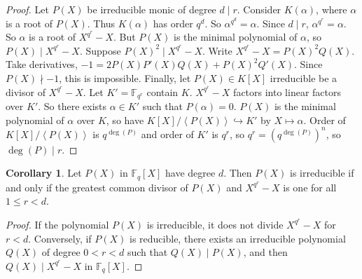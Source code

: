 \documentclass{article}
\newcommand{\F}{\mathbb{F}}
\newcommand{\rb}[1]{\left( #1 \right)}
\renewcommand{\sb}[1]{\left[ #1 \right]}
\newcommand{\ab}[1]{\left\langle #1 \right\rangle}
\theoremstyle{definition}\newtheorem{definition}{Definition}[subsection]
\theoremstyle{definition}\newtheorem{remark}[definition]{Remark}
\theoremstyle{definition}\newtheorem*{example}{Example}
\theoremstyle{definition}\newtheorem*{note}{Note}
\newtheorem{corollary}[definition]{Corollary}
\begin{document}
\begin{proof}
Let $ P\rb{X} $ be irreducible monic of degree $ d \mid r $. Consider $ K\rb{\alpha} $, where $ \alpha $ is a root of $ P\rb{X} $. Thus $ K\rb{\alpha} $ has order $ q^d $. So $ \alpha^{q^d} = \alpha $. Since $ d \mid r $, $ \alpha^{q^r} = \alpha $. So $ \alpha $ is a root of $ X^{q^r} - X $. But $ P\rb{X} $ is the minimal polynomial of $ \alpha $, so $ P\rb{X} \mid X^{q^r} - X $. Suppose $ P\rb{X}^2 \mid X^{q^r} - X $. Write $ X^{q^r} - X = P\rb{X}^2Q\rb{X} $. Take derivatives, $ -1 = 2P\rb{X}P'\rb{X}Q\rb{X} + P\rb{X}^2Q'\rb{X} $. Since $ P\rb{X} \nmid -1 $, this is impossible. Finally, let $ P\rb{X} \in K\sb{X} $ irreducible be a divisor of $ X^{q^r} - X $. Let $ K' = \F_{q^r} $ contain $ K $. $ X^{q^r} - X $ factors into linear factors over $ K' $. So there exists $ \alpha \in K' $ such that $ P\rb{\alpha} = 0 $. $ P\rb{X} $ is the minimal polynomial of $ \alpha $ over $ K $, so have $ K\sb{X} / \ab{P\rb{X}} \hookrightarrow K' $ by $ X \mapsto \alpha $. Order of $ K\sb{X} / \ab{P\rb{X}} $ is $ q^{\deg\rb{P}} $ and order of $ K' $ is $ q^r $, so $ q^r = \rb{q^{\deg\rb{P}}}^n $, so $ \deg\rb{P} \mid r $.
\end{proof}

\begin{corollary}
Let $ P\rb{X} $ in $ \F_q\sb{X} $ have degree $ d $. Then $ P\rb{X} $ is irreducible if and only if the greatest common divisor of $ P\rb{X} $ and $ X^{q^r} - X $ is one for all $ 1 \le r < d $.
\end{corollary}

\begin{proof}
If the polynomial $ P\rb{X} $ is irreducible, it does not divide $ X^{q^r} - X $ for $ r < d $. Conversely, if $ P\rb{X} $ is reducible, there exists an irreducible polynomial $ Q\rb{X} $ of degree $ 0 < r < d $ such that $ Q\rb{X} \mid P\rb{X} $, and then $ Q\rb{X} \mid X^{q^r} - X $ in $ \F_q\sb{X} $.
\end{proof}
\end{document}
